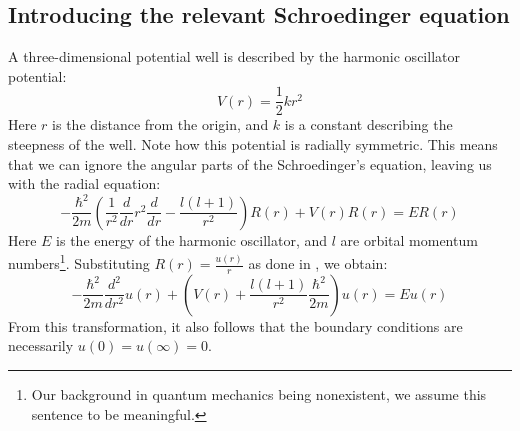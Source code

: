 \documentclass[a4paper, 10pt]{article}
\begin{document}
\subsection{Introducing the relevant Schroedinger equation}\label{sec:Intro_Schroedinger}
A three-dimensional potential well is described by the harmonic oscillator potential:
\begin{equation}
V(r)=\frac{1}{2}kr^2
\end{equation} 
Here $r$ is the distance from the origin, and $k$ is a constant describing the steepness of the well. Note how this potential is radially symmetric. This means that we can ignore the angular parts of the Schroedinger's equation, leaving us with the radial equation:
\begin{equation}
-\frac{\hbar^2}{2m}\left(\frac{1}{r^2}\frac{d}{dr}r^2 \frac{d}{dr}-\frac{l(l+1)}{r^2}\right)R(r)+V(r)R(r)=ER(r)
\end{equation}
Here $E$ is the energy of the harmonic oscillator, and $l$ are orbital momentum numbers\footnote{Our background in quantum mechanics being nonexistent, we assume this sentence to be meaningful.}. Substituting $R(r)=\frac{u(r)}{r}$ as done in \cite{Morten}, we obtain:
\begin{equation}\label{eq:Radial_Schroedinger}
-\frac{\hbar^2}{2m}\frac{d^2}{dr^2}u(r)+\left(V(r)+\frac{l(l+1)}{r^2}\frac{\hbar^2}{2m}\right)u(r)=Eu(r)
\end{equation}
From this transformation, it also follows that the boundary conditions are necessarily $u(0)=u(\infty)=0$.  
\end{document}
